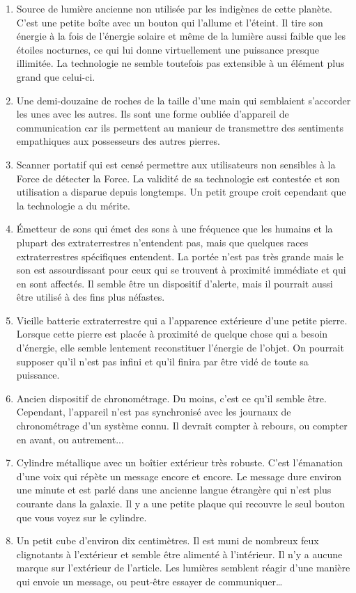 \documentclass{article}
\begin{document}
\begin{enumerate}
	\item Source de lumière ancienne non utilisée par les indigènes de cette planète. C'est une petite boîte avec un bouton qui l'allume et l'éteint. Il tire son énergie à la fois de l'énergie solaire et même de la lumière aussi faible que les étoiles nocturnes, ce qui lui donne virtuellement une puissance presque illimitée. La technologie ne semble toutefois pas extensible à un élément plus grand que celui-ci.
	\item Une demi-douzaine de roches de la taille d'une main qui semblaient s'accorder les unes avec les autres. Ils sont une forme oubliée d'appareil de communication car ils permettent au manieur de transmettre des sentiments empathiques aux possesseurs des autres pierres.
	\item Scanner portatif qui est censé permettre aux utilisateurs non sensibles à la Force de détecter la Force. La validité de sa technologie est contestée et son utilisation a disparue depuis longtemps. Un petit groupe croit cependant que la technologie a du mérite.
	\item Émetteur de sons qui émet des sons à une fréquence que les humains et la plupart des extraterrestres n'entendent pas, mais que quelques races extraterrestres spécifiques entendent. La portée n'est pas très grande mais le son est assourdissant pour ceux qui se trouvent à proximité immédiate et qui en sont affectés. Il semble être un dispositif d'alerte, mais il pourrait aussi être utilisé à des fins plus néfastes.
	\item Vieille batterie extraterrestre qui a l'apparence extérieure d'une petite pierre. Lorsque cette pierre est placée à proximité de quelque chose qui a besoin d'énergie, elle semble lentement reconstituer l'énergie de l'objet. On pourrait supposer qu'il n'est pas infini et qu'il finira par être vidé de toute sa puissance. 
	\item Ancien dispositif de chronométrage. Du moins, c'est ce qu'il semble être. Cependant, l'appareil n'est pas synchronisé avec les journaux de chronométrage d'un système connu. Il devrait compter à rebours, ou compter en avant, ou autrement...
	\item Cylindre métallique avec un boîtier extérieur très robuste. C'est l'émanation d'une voix qui répète un message encore et encore. Le message dure environ une minute et est parlé dans une ancienne langue étrangère qui n'est plus courante dans la galaxie. Il y a une petite plaque qui recouvre le seul bouton que vous voyez sur le cylindre.
	\item Un petit cube d'environ dix centimètres. Il est muni de nombreux feux clignotants à l'extérieur et semble être alimenté à l'intérieur. Il n'y a aucune marque sur l'extérieur de l'article. Les lumières semblent réagir d'une manière qui envoie un message, ou peut-être essayer de communiquer\ldots
\end{enumerate}
\end{document}
